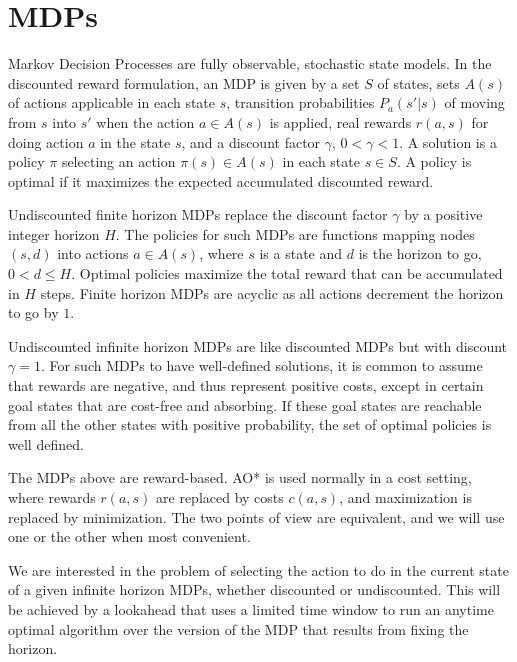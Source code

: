 \documentclass[letterpaper]{article}
\newcommand{\Omit}[1]{}
\begin{document}
\Omit{
The paper is organized as follows. We review MDPs, AO* and UCT, and then introduce Anytime AO* and
compare it with UCT. }

\section{MDPs}

Markov Decision Processes are fully observable, stochastic state models.
In the discounted reward formulation, an MDP is given by a set $S$ of states,  
sets $A(s)$  of actions applicable in each state $s$, transition probabilities 
$P_a(s'|s)$ of moving from $s$ into $s'$ when the action $a \in A(s)$ is applied,
real rewards  $r(a,s)$ for  doing action $a$ in the state $s$, and a discount 
factor $\gamma$, $0 < \gamma < 1$. A solution  is a policy $\pi$
selecting an action $\pi(s) \in A(s)$ in each state $s \in S$. A policy is 
optimal if it maximizes the expected accumulated discounted reward.

Undiscounted finite horizon MDPs replace the discount factor $\gamma$
by a positive integer horizon $H$. The policies for such MDPs are 
functions  mapping nodes $(s,d)$ into actions $a \in A(s)$, where $s$
is a state and $d$ is the horizon to go, $0 <  d \leq H$. Optimal
policies maximize the total reward that can be accumulated in $H$
steps. Finite horizon MDPs are acyclic as all actions decrement the 
horizon to go by $1$. 

Undiscounted infinite horizon MDPs are like discounted MDPs but
with discount $\gamma=1$. For such MDPs to have well-defined
solutions, it is common to assume that rewards are negative, and 
thus represent positive costs, except in certain goal states
that are cost-free and absorbing. If these goal states
are reachable from all the other  states  with positive 
probability, the set of optimal policies is well defined.

The MDPs above are reward-based. AO* is used normally in a cost
setting, where rewards $r(a,s)$ are replaced by costs $c(a,s)$,
and maximization is replaced by minimization. The two points of
view are equivalent, and we will use one or the other 
when most convenient.

We  are interested in the problem of selecting the 
action to do in the current state of a given infinite horizon MDPs, whether
discounted or undiscounted. This will be achieved by a lookahead that
uses a limited time window to run an anytime optimal algorithm over the version 
of the MDP that results from fixing the horizon.
\end{document}
